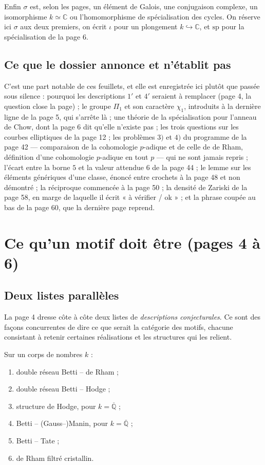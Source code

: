 \documentclass[11pt,a4paper]{article}
\begin{document}
Enfin $\sigma$ est, selon les pages, un élément de Galois, une conjugaison
complexe, un isomorphisme $k \simeq \mathbb{C}$ ou l'homomorphisme de
spécialisation des cycles. On réserve ici $\sigma$ aux deux premiers, on écrit
$\iota$ pour un plongement $k \hookrightarrow \mathbb{C}$, et $\mathrm{sp}$ pour
la spécialisation de la page 6.

\subsection*{Ce que le dossier annonce et n'établit pas}

C'est une part notable de ces feuillets, et elle est enregistrée ici plutôt que
passée sous silence : pourquoi les descriptions $1'$ et $4'$ seraient à
remplacer (page 4, la question close la page) ; le groupe $\Pi_{1}$ et son
caractère $\chi_{1}$, introduits à la dernière ligne de la page 5, qui s'arrête
là ; une théorie de la spécialisation pour l'anneau de Chow, dont la page 6 dit
qu'elle n'existe pas ; les trois questions sur les courbes elliptiques de la
page 12 ; les problèmes $3)$ et $4)$ du programme de la page 42 — comparaison
de la cohomologie $p$-adique et de celle de de Rham, définition d'une
cohomologie $p$-adique en tout $p$ — qui ne sont jamais repris ; l'écart entre
la borne $5$ et la valeur attendue $6$ de la page 44 ; le lemme sur les éléments
génériques d'une classe, énoncé entre crochets à la page 48 et non démontré ; la
réciproque commencée à la page 50 ; la densité de Zariski de la page 58, en
marge de laquelle il écrit « à vérifier / ok » ; et la phrase coupée au bas de
la page 60, que la dernière page reprend.

\section*{Ce qu'un motif doit être (pages 4 à 6)}

\subsection*{Deux listes parallèles}

La page 4 dresse côte à côte deux listes de \emph{descriptions conjecturales}.
Ce sont des façons concurrentes de dire ce que serait la catégorie des motifs,
chacune consistant à retenir certaines réalisations et les structures qui les
relient.

Sur un corps de nombres $k$ :

\begin{enumerate}
  \item double réseau Betti -- de Rham ;
  \item double réseau Betti -- Hodge ;
  \item structure de Hodge, pour $k = \overline{\mathbb{Q}}$ ;
  \item Betti -- (Gauss--)Manin, pour $k = \overline{\mathbb{Q}}$ ;
  \item Betti -- Tate ;
  \item de Rham filtré cristallin.
\end{enumerate}
\end{document}
